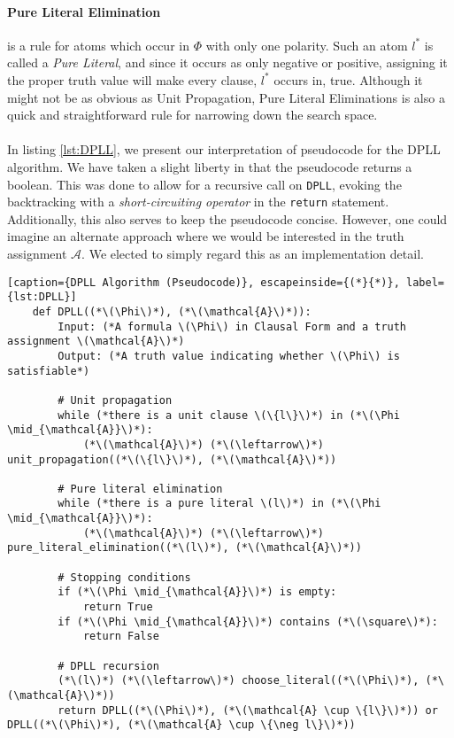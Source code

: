 \paragraph{Pure Literal Elimination} is a rule for atoms which occur in \(\Phi\) with only one polarity. Such an atom \(l^{*}\) is called a \emph{Pure Literal}, and since it occurs as only negative or positive, assigning it the proper truth value will make every clause, \(l^{*}\) occurs in, true. Although it might not be as obvious as Unit Propagation, Pure Literal Eliminations is also a quick and straightforward rule for narrowing down the search space.
\\
\\
In listing \ref{lst:DPLL}, we present our interpretation of pseudocode for the DPLL algorithm. We have taken a slight liberty in that the pseudocode returns a boolean. This was done to allow for a recursive call on \texttt{DPLL}, evoking the backtracking with a \emph{short-circuiting operator} in the \texttt{return} statement. Additionally, this also serves to keep the pseudocode concise. However, one could imagine an alternate approach where we would be interested in the truth assignment \(\mathcal{A}\). We elected to simply regard this as an implementation detail.
\begin{lstlisting}[caption={DPLL Algorithm (Pseudocode)}, escapeinside={(*}{*)}, label={lst:DPLL}]
    def DPLL((*\(\Phi\)*), (*\(\mathcal{A}\)*)):
        Input: (*A formula \(\Phi\) in Clausal Form and a truth assignment \(\mathcal{A}\)*)
        Output: (*A truth value indicating whether \(\Phi\) is satisfiable*)

        # Unit propagation
        while (*there is a unit clause \(\{l\}\)*) in (*\(\Phi \mid_{\mathcal{A}}\)*):
            (*\(\mathcal{A}\)*) (*\(\leftarrow\)*) unit_propagation((*\(\{l\}\)*), (*\(\mathcal{A}\)*))

        # Pure literal elimination
        while (*there is a pure literal \(l\)*) in (*\(\Phi \mid_{\mathcal{A}}\)*):
            (*\(\mathcal{A}\)*) (*\(\leftarrow\)*) pure_literal_elimination((*\(l\)*), (*\(\mathcal{A}\)*))

        # Stopping conditions
        if (*\(\Phi \mid_{\mathcal{A}}\)*) is empty:
            return True
        if (*\(\Phi \mid_{\mathcal{A}}\)*) contains (*\(\square\)*):
            return False

        # DPLL recursion
        (*\(l\)*) (*\(\leftarrow\)*) choose_literal((*\(\Phi\)*), (*\(\mathcal{A}\)*))
        return DPLL((*\(\Phi\)*), (*\(\mathcal{A} \cup \{l\}\)*)) or DPLL((*\(\Phi\)*), (*\(\mathcal{A} \cup \{\neg l\}\)*))
\end{lstlisting}




